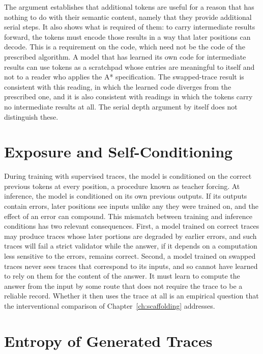 The argument establishes that additional tokens are useful for a reason that has nothing to do with their semantic content, namely that they provide additional serial steps. It also shows what is required of them: to carry intermediate results forward, the tokens must encode those results in a way that later positions can decode. This is a requirement on the code, which need not be the code of the prescribed algorithm. A model that has learned its own code for intermediate results can use tokens as a scratchpad whose entries are meaningful to itself and not to a reader who applies the A* specification. The swapped-trace result is consistent with this reading, in which the learned code diverges from the prescribed one, and it is also consistent with readings in which the tokens carry no intermediate results at all. The serial depth argument by itself does not distinguish these.

\section{Exposure and Self-Conditioning}

During training with supervised traces, the model is conditioned on the correct previous tokens at every position, a procedure known as teacher forcing. At inference, the model is conditioned on its own previous outputs. If its outputs contain errors, later positions see inputs unlike any they were trained on, and the effect of an error can compound. This mismatch between training and inference conditions has two relevant consequences. First, a model trained on correct traces may produce traces whose later portions are degraded by earlier errors, and such traces will fail a strict validator while the answer, if it depends on a computation less sensitive to the errors, remains correct. Second, a model trained on swapped traces never sees traces that correspond to its inputs, and so cannot have learned to rely on them for the content of the answer. It must learn to compute the answer from the input by some route that does not require the trace to be a reliable record. Whether it then uses the trace at all is an empirical question that the interventional comparison of Chapter~\ref{ch:scaffolding} addresses.

\section{Entropy of Generated Traces}

